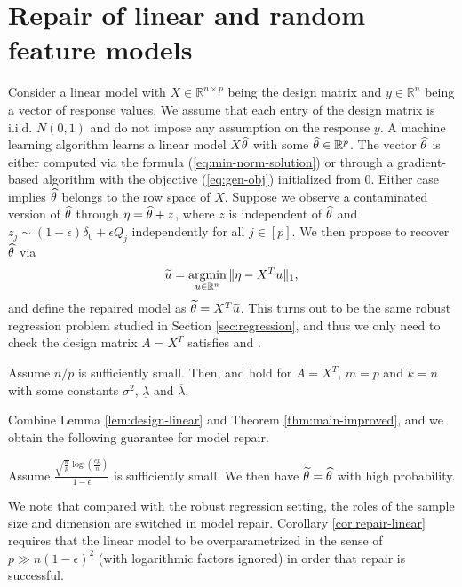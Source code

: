 


\section{Repair of linear and random feature models}
\label{sec:linear}

Consider a linear model with $X\in\mathbb{R}^{n\times p}$ being the design matrix and $y\in\mathbb{R}^n$ being a vector of response values. We assume that each entry of the design matrix is i.i.d. $N(0,1)$ and do not impose any assumption on the response $y$. A machine learning algorithm learns a linear model $X\widehat{\theta}$ with some $\widehat{\theta}\in\mathbb{R}^{p}$. The vector $\widehat{\theta}$ is either computed via the formula (\ref{eq:min-norm-solution}) or through a gradient-based algorithm with the objective (\ref{eq:gen-obj}) initialized from $0$. Either case implies $\widehat{\theta}$ belongs to the row space of $X$. Suppose we observe a contaminated version of $\widehat{\theta}$ through $
\eta=\widehat{\theta}+z$, where $z$ is independent of $\widehat{\theta}$ and $z_j\sim (1-\epsilon)\delta_0+\epsilon Q_j$ independently for all $j\in[p]$. We then propose to recover $\widehat{\theta}$ via
$$\widetilde{u}=\mathop{\rm argmin}_{u\in\mathbb{R}^n}\|\eta-X^Tu\|_1,$$
and define the repaired model as $\widetilde{\theta}=X^T\widetilde{u}$. This turns out to be the same robust regression problem studied in Section \ref{sec:regression}, and thus we only need to check the design matrix $A=X^T$ satisfies \conditionA{} and \conditionB.
\begin{lemma}\label{lem:design-linear}
Assume $n/p$ is sufficiently small. Then, \conditionA{} and \conditionB{} hold for $A=X^T$, $m=p$ and $k=n$ with some constants $\sigma^2$, $\underline{\lambda}$ and $\overline{\lambda}$.
\end{lemma}
Combine Lemma \ref{lem:design-linear} and Theorem \ref{thm:main-improved}, and we obtain the following guarantee for model repair.
\begin{corollary}\label{cor:repair-linear}
Assume $\frac{\sqrt{\frac{n}{p}}\log\left(\frac{ep}{n}\right)}{1-\epsilon}$ is sufficiently small. We then have $\widetilde{\theta}=\widehat{\theta}$ with high probability.
\end{corollary}

We note that compared with the robust regression setting, the roles of the sample size and dimension are switched in model repair. Corollary \ref{cor:repair-linear} requires that the linear model to be overparametrized in the sense of $p\gg n(1-\epsilon)^2$ (with logarithmic factors ignored) in order that repair is successful. 

